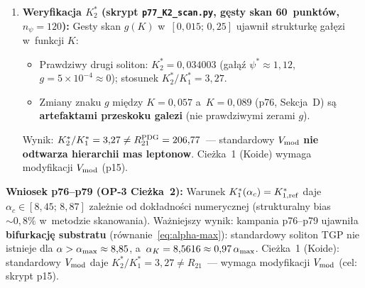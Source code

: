 \begin{result}
\begin{enumerate}[nosep]
  \item \textbf{Weryfikacja $K^*_2$ (skrypt \texttt{p77\_K2\_scan.py}, g\k{e}sty skan
    60~punkt\'ow, $n_\psi = 120$):}
    Gesty skan $g(K)$ w~$[0{,}015;\,0{,}25]$ ujawni\l{} strukturk\k{e}
    ga\l{}\k{e}zi w~funkcji $K$:
    \begin{itemize}[nosep]
      \item Prawdziwy drugi soliton: $K^*_2 = 0{,}034003$
            (ga\l{}\k{a}\'z $\psi^* \approx 1{,}12$,
             $g = 5 \times 10^{-4} \approx 0$);
            stosunek $K^*_2/K^*_1 = 3{,}27$.
      \item Zmiany znaku $g$ mi\k{e}dzy $K=0{,}057$ a~$K=0{,}089$
            (p76, Sekcja~D) s\k{a} \textbf{artefaktami przeskoku galezi}
            (nie prawdziwymi zerami $g$).
    \end{itemize}
    Wynik: $K^*_2/K^*_1 = 3{,}27 \neq R_{21}^{\rm PDG} = 206{,}77$~---
    standardowy $V_{\rm mod}$ \textbf{nie odtwarza hierarchii mas leptonow}.
    Cie\.zka~1 (Koide) wymaga modyfikacji $V_{\rm mod}$ (p15).
\end{enumerate}
\textbf{Wniosek p76--p79 (OP-3 Cie\.zka~2):}
Warunek $K^*_1(\alpha_c) = K^*_{1,\rm ref}$ daje $\alpha_c \in [8{,}45;\,8{,}87]$
zale\.znie od dok\l{}adno\'sci numerycznej (strukturalny bias~$\sim 0{,}8\%$
w~metodzie skanowania).
Wa\.zniejszy wynik: kampania p76--p79 ujawni\l{}a \textbf{bifurkacj\k{e} substratu}
(r\'ownanie~\eqref{eq:alpha-max}):
standardowy soliton TGP nie istnieje dla $\alpha > \alpha_{\rm max} \approx 8{,}85$,
a~$\alpha_K = 8{,}5616 \approx 0{,}97\,\alpha_{\rm max}$.
Cie\.zka~1 (Koide): standardowy $V_{\rm mod}$ daje $K^*_2/K^*_1 = 3{,}27 \neq R_{21}$~---
wymaga modyfikacji $V_{\rm mod}$ (cel: skrypt p15).
\end{result}

